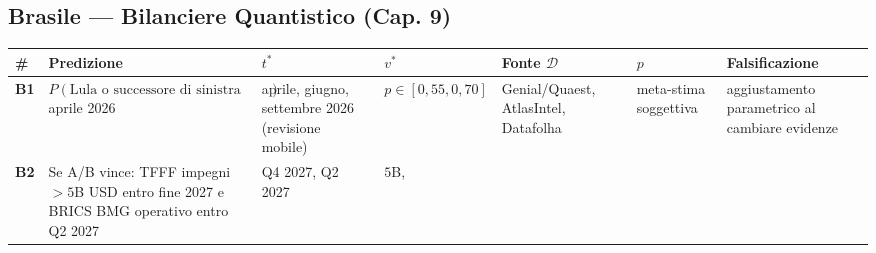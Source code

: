 \subsection{Brasile --- Bilanciere Quantistico (Cap.
9)}\label{brasile-bilanciere-quantistico-cap.-9}

{\def\LTcaptype{none} %
{\small\begin{longtable}[]{@{}
  >{\raggedright\arraybackslash}p{}
  >{\raggedright\arraybackslash}p{}
  >{\raggedright\arraybackslash}p{}
  >{\raggedright\arraybackslash}p{}
  >{\raggedright\arraybackslash}p{}
  >{\raggedright\arraybackslash}p{}
  >{\raggedright\arraybackslash}p{}@{}}
\toprule\noalign{}
\begin{minipage}[b]{\linewidth}\raggedright
\#
\end{minipage} & \begin{minipage}[b]{\linewidth}\raggedright
Predizione
\end{minipage} & \begin{minipage}[b]{\linewidth}\raggedright
\(t^*\)
\end{minipage} & \begin{minipage}[b]{\linewidth}\raggedright
\(v^*\)
\end{minipage} & \begin{minipage}[b]{\linewidth}\raggedright
Fonte \(\mathcal{D}\)
\end{minipage} & \begin{minipage}[b]{\linewidth}\raggedright
\(p\)
\end{minipage} & \begin{minipage}[b]{\linewidth}\raggedright
Falsificazione
\end{minipage} \\
\midrule\noalign{}
\endhead
\bottomrule\noalign{}
\endlastfoot
\textbf{B1} & \(P(\text{Lula o successore di sinistra vince elezioni})\)
aprile 2026 & aprile, giugno, settembre 2026 (revisione mobile) &
\(p \in [0{,}55, 0{,}70]\) & Genial/Quaest, AtlasIntel, Datafolha &
meta-stima soggettiva & aggiustamento parametrico al cambiare
evidenze \\
\textbf{B2} & Se A/B vince: TFFF impegni \(> 5\)B USD entro fine 2027 e
BRICS BMG operativo entro Q2 2027 & Q4 2027, Q2 2027 & \(5\)B,

\end{longtable}}}
